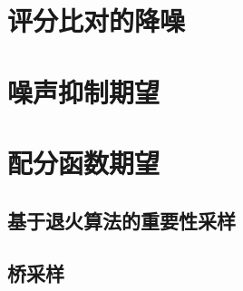 \section{评分比对的降噪}
\label{sec:18.5}

\section{噪声抑制期望}
\label{sec:18.6}

\section{配分函数期望}
\label{sec:18.7}

\subsection{基于退火算法的重要性采样}
\label{sec:18.7.1}

\subsection{桥采样}
\label{sec:18.7.2}